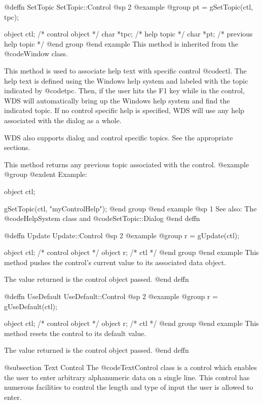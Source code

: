 @deffn {SetTopic} SetTopic::Control
@sp 2
@example
@group
pt = gSetTopic(ctl, tpc);

object  ctl;    /*  control object        */
char    *tpc;   /*  help topic            */
char    *pt;    /*  previous help topic   */
@end group
@end example
This method is inherited from the @code{Window} class.

This method is used to associate help text with specific control @code{ctl}.
The help text is defined using the Windows help system and labeled
with the topic indicated by @code{tpc}.  Then, if the user hits
the F1 key while in the control, WDS will automatically bring up
the Windows help system and find the indicated topic.  If no control
specific help is specified, WDS will use any help associated with the
dialog as a whole.

WDS also supports dialog and control specific topics.  See the appropriate
sections.

This method returns any previous topic associated with the control.
@example
@group
@exdent Example:

object  ctl;

gSetTopic(ctl, "myControlHelp");
@end group
@end example
@sp 1
See also:  The @code{HelpSystem} class and @code{SetTopic::Dialog}
@end deffn



@deffn {Update} Update::Control
@sp 2
@example
@group
r = gUpdate(ctl);

object  ctl;   /*  control object  */
object  r;     /*  ctl             */
@end group
@end example
This method pushes the control's current value to its associated
data object.

The value returned is the control object passed.
@end deffn



@deffn {UseDefault} UseDefault::Control
@sp 2
@example
@group
r = gUseDefault(ctl);

object  ctl;   /*  control object  */
object  r;     /*  ctl             */
@end group
@end example
This method resets the control to its default value.

The value returned is the control object passed.
@end deffn



@subsection Text Control
The @code{TextControl} class is a control which enables the user to
enter arbitrary alphanumeric data on a single line.  This control
has numerous facilities to control the length and type of input the
user is allowed to enter.

